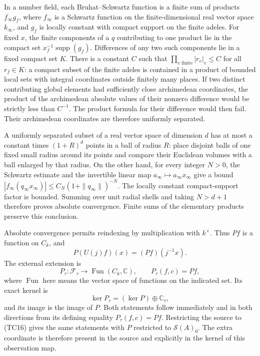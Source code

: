 \documentclass[
  10pt,
]{article}
\begin{document}
In a number field, each Bruhat--Schwartz function is a finite sum of
products \(f_\infty g_f\), where \(f_\infty\) is a Schwartz function on
the finite-dimensional real vector space \(k_\infty\), and \(g_f\) is
locally constant with compact support on the finite adeles. For fixed
\(x\), the finite components of a \(q\) contributing to one product lie
in the compact set \(x_f^{-1}\operatorname{supp}(g_f)\). Differences of
any two such components lie in a fixed compact set \(K\). There is a
constant \(C\) such that \(\prod_{v\text{ finite}}|r_v|_v\le C\) for all
\(r_f\in K\): a compact subset of the finite adeles is contained in a
product of bounded local sets with integral coordinates outside finitely
many places. If two distinct contributing global elements had
sufficiently close archimedean coordinates, the product of the
archimedean absolute values of their nonzero difference would be
strictly less than \(C^{-1}\). The product formula for their difference
would then fail. Their archimedean coordinates are therefore uniformly
separated.

A uniformly separated subset of a real vector space of dimension \(d\)
has at most a constant times \((1+R)^d\) points in a ball of radius
\(R\): place disjoint balls of one fixed small radius around its points
and compare their Euclidean volumes with a ball enlarged by that radius.
On the other hand, for every integer \(N>0\), the Schwartz estimate and
the invertible linear map \(a_\infty\mapsto a_\infty x_\infty\) give a
bound \(|f_\infty(q_\infty x_\infty)|\le C_N(1+\|q_\infty\|)^{-N}\). The
locally constant compact-support factor is bounded. Summing over unit
radial shells and taking \(N>d+1\) therefore proves absolute
convergence. Finite sums of the elementary products preserve this
conclusion.

Absolute convergence permits reindexing by multiplication with
\(k^\times\). Thus \(Pf\) is a function on \(C_k\), and \[
P(U(j)f)(x)=(Pf)(j^{-1}x).
\tag{TC19}
\] The external extension is \[
P_\tau:\mathcal F_\tau\to\operatorname{Fun}(C_k,\mathbb C),
\qquad P_\tau(f,c)=Pf,
\tag{TC20}
\] where \(\operatorname{Fun}\) here means the vector space of functions
on the indicated set. Its exact kernel is \[
\ker P_\tau=(\ker P)\oplus\mathbb C_\tau,
\tag{TC21}
\] and its image is the image of \(P\). Both statements follow
immediately and in both directions from its defining equality
\(P_\tau(f,c)=Pf\). Restricting the source to (TC16) gives the same
statements with \(P\) restricted to \(\mathcal S(A)_0\). The extra
coordinate is therefore present in the source and explicitly in the
kernel of this observation map.
\end{document}
